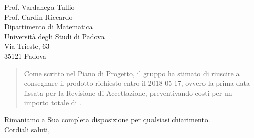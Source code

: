 \begin{letter}{
		Prof. Vardanega Tullio \\
		Prof. Cardin Riccardo \\
		Dipartimento di Matematica \\
		Università degli Studi di Padova \\
		Via Trieste, 63 \\
		35121 Padova}
\begin{quotation}
\noindent Come scritto nel Piano di Progetto, il gruppo ha stimato di riuscire a 
consegnare il prodotto richiesto entro il 2018-05-17, ovvero la prima data 
fissata per la Revisione di Accettazione, preventivando costi per un importo 
totale di .
\end{quotation}

\closing{Rimaniamo a Sua completa disposizione per qualsiasi chiarimento. \\
		Cordiali saluti, }
		
\end{letter}


